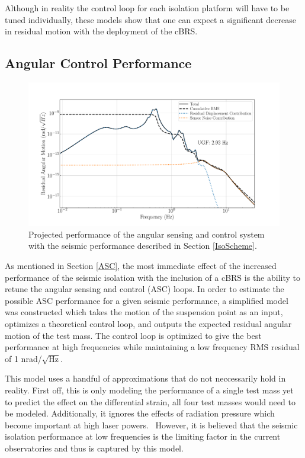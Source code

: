 \documentclass [12pt, proquest]{uwthesis}[2019]
\begin{document}
Although in reality the control loop for each isolation platform will have to be tuned individually, these models show that one can expect a significant decrease in residual motion with the deployment of the cBRS.

\subsection{Angular Control Performance}

\begin{figure}[!h]
\begin{center}
\includegraphics[width=\textwidth]{cBRS_ASC_With.pdf}
\caption[Projected performance of the angular sensing and control system]{Projected performance of the angular sensing and control system with the seismic performance described in Section \ref{IsoScheme}.}
\label{ascWith}
\end{center}
\end{figure}

As mentioned in Section \ref{ASC}, the most immediate effect of the increased performance of the seismic isolation with the inclusion of a cBRS is the ability to retune the angular sensing and control (ASC) loops. In order to estimate the possible ASC performance for a given seismic performance, a simplified model was constructed which takes the motion of the suspension point as an input, optimizes a theoretical control loop, and outputs the expected residual angular motion of the test mass. The control loop is optimized to give the best performance at high frequencies while maintaining a low frequency RMS residual of 1 nrad/$\sqrt{\text{Hz}}$.

This model uses a handful of approximations that do not neccessarily hold in reality. First off, this is only modeling the performance of a single test mass yet to predict the effect on the differential strain, all four test masses would need to be modeled. Additionally, it ignores the effects of radiation pressure which become important at high laser powers.~\cite{ASC} However, it is believed that the seismic isolation performance at low frequencies is the limiting factor in the current observatories and thus is captured by this model. 
\end{document}
